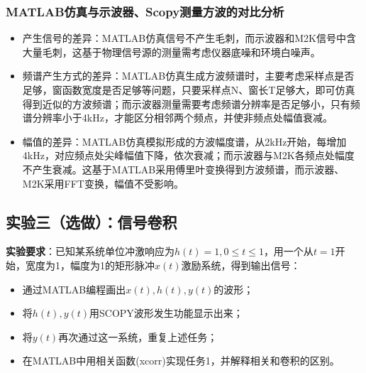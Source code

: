 \documentclass[12pt]{article}
\begin{document}
\subsubsection{MATLAB仿真与示波器、Scopy测量方波的对比分析}
\begin{itemize}
    \item 产生信号的差异：MATLAB仿真信号不产生毛刺，而示波器和M2K信号中含大量毛刺，这基于物理信号源的测量需考虑仪器底噪和环境白噪声。
    \item 频谱产生方式的差异：MATLAB仿真生成方波频谱时，主要考虑采样点是否足够，窗函数宽度是否足够等问题，只要采样点N、窗长T足够大，即可仿真得到近似的方波频谱；而示波器测量需要考虑频谱分辨率是否足够小，只有频谱分辨率小于4kHz，才能区分相邻两个频点，并使非频点处幅值衰减。
    \item 幅值的差异：MATLAB仿真模拟形成的方波幅度谱，从2kHz开始，每增加4kHz，对应频点处尖峰幅值下降，依次衰减；而示波器与M2K各频点处幅度不产生衰减。这基于MATLAB采用傅里叶变换得到方波频谱，而示波器、M2K采用FFT变换，幅值不受影响。
\end{itemize}



\subsection{实验三（选做）：信号卷积}
\textbf{实验要求}：已知某系统单位冲激响应为$h(t)=1,0\le t\le1$，用一个从$t=1$开始，宽度为1，幅度为1的矩形脉冲$x(t)$激励系统，得到输出信号：
\begin{itemize}
\setlength{\itemsep}{0pt}
\setlength{\parsep}{0pt}
\setlength{\parskip}{0pt}
    \item 通过MATLAB编程画出$x(t),h(t),y(t)$的波形；
    \item 将$h(t),y(t)$用SCOPY波形发生功能显示出来；
    \item 将$y(t)$再次通过这一系统，重复上述任务；
    \item 在MATLAB中用相关函数(xcorr)实现任务1，并解释相关和卷积的区别。
\end{itemize}
\end{document}
